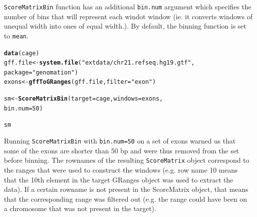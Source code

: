 \documentclass{article}\usepackage[]{graphicx}\usepackage[]{color}
\makeatletter
\newcommand{\hlnum}[1]{\textcolor[rgb]{0.686,0.059,0.569}{#1}}%
\newcommand{\hlstr}[1]{\textcolor[rgb]{0.192,0.494,0.8}{#1}}%
\newcommand{\hlstd}[1]{\textcolor[rgb]{0.345,0.345,0.345}{#1}}%
\newcommand{\hlkwb}[1]{\textcolor[rgb]{0.69,0.353,0.396}{#1}}%
\newcommand{\hlkwc}[1]{\textcolor[rgb]{0.333,0.667,0.333}{#1}}%
\newcommand{\hlkwd}[1]{\textcolor[rgb]{0.737,0.353,0.396}{\textbf{#1}}}%
\newenvironment{kframe}{%
 \def\at@end@of@kframe{}%
 \ifinner\ifhmode%
  \def\at@end@of@kframe{\end{minipage}}%
  \begin{minipage}{\columnwidth}%
 \fi\fi%
 \def\FrameCommand##1{\hskip\@totalleftmargin \hskip-\fboxsep
 \colorbox{shadecolor}{##1}\hskip-\fboxsep
     \hskip-\linewidth \hskip-\@totalleftmargin \hskip\columnwidth}%
 \MakeFramed {\advance\hsize-\width
   \@totalleftmargin\z@ \linewidth\hsize
   \@setminipage}}%
 {\par\unskip\endMakeFramed%
 \at@end@of@kframe}
\newenvironment{knitrout}{}{} %
\newcommand{\Rcode}[1]{{\texttt{#1}}}
\makeatother
\begin{document}
\Rcode{ScoreMatrixBin} function has an additional \Rcode{bin.num} argument which
specifies the number of bins that will represent each windot window  
(ie. it converts windows of unequal width into ones of equal width.). 
By default, the binning function is set
to \Rcode{mean}.
\begin{knitrout}
\color{fgcolor}\begin{kframe}
\begin{alltt}
\hlkwd{data}\hlstd{(cage)}
\hlstd{gff.file} \hlkwb{<-} \hlkwd{system.file}\hlstd{(}\hlstr{"extdata/chr21.refseq.hg19.gtf"}\hlstd{,}
    \hlkwc{package} \hlstd{=} \hlstr{"genomation"}\hlstd{)}
\hlstd{exons} \hlkwb{<-} \hlkwd{gffToGRanges}\hlstd{(gff.file,} \hlkwc{filter} \hlstd{=} \hlstr{"exon"}\hlstd{)}
\end{alltt}


{\ttfamily\noindent\itshape\color{messagecolor}{\#\# Filtering exon features...}}\begin{alltt}
\hlstd{sm} \hlkwb{<-} \hlkwd{ScoreMatrixBin}\hlstd{(}\hlkwc{target} \hlstd{= cage,} \hlkwc{windows} \hlstd{= exons,}
    \hlkwc{bin.num} \hlstd{=} \hlnum{50}\hlstd{)}
\end{alltt}


{\ttfamily\noindent\color{warningcolor}{\#\# Warning: supplied GRanges object contains ranges of width < number of bins}}\begin{alltt}
\hlstd{sm}
\end{alltt}


{\ttfamily\noindent\itshape\color{messagecolor}{\#\#\ \  scoreMatrix with dims: 5127 50}}\end{kframe}
\end{knitrout}


Running \Rcode{ScoreMatrixBin} with \Rcode{bin.num=50} on 
a set of exons warned us that some of the exons are shorter than 50 bp and
were thus removed from the set before binning. 
The rownames of the resulting \Rcode{ScoreMatrix} object correspond
to the ranges that were used to construct the windows (e.g. row name 10 means 
that the 10th element in the target GRanges object was used to extract the data). 
If a certain rowname is not present in the ScoreMatrix object, that means that 
the corresponding range was filtered out (e.g. the range could have been on a 
chromosome that was not present in the target).
\end{document}
